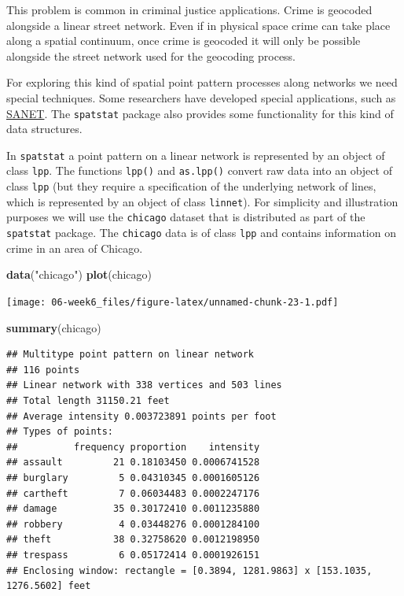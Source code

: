 \documentclass[]{book}
\newenvironment{Shaded}{\begin{snugshade}}{\end{snugshade}}
\newcommand{\KeywordTok}[1]{\textcolor[rgb]{0.13,0.29,0.53}{\textbf{#1}}}
\newcommand{\NormalTok}[1]{#1}
\newcommand{\StringTok}[1]{\textcolor[rgb]{0.31,0.60,0.02}{#1}}
\begin{document}
This problem is common in criminal justice applications. Crime is geocoded alongside a linear street network. Even if in physical space crime can take place along a spatial continuum, once crime is geocoded it will only be possible alongside the street network used for the geocoding process.

For exploring this kind of spatial point pattern processes along networks we need special techniques. Some researchers have developed special applications, such as \href{http://sanet.csis.u-tokyo.ac.jp/sub_en/manual.html}{SANET}. The \texttt{spatstat} package also provides some functionality for this kind of data structures.

In \texttt{spatstat} a point pattern on a linear network is represented by an object of class \texttt{lpp}. The functions \texttt{lpp()} and \texttt{as.lpp()} convert raw data into an object of class \texttt{lpp} (but they require a specification of the underlying network of lines, which is represented by an object of class \texttt{linnet}). For simplicity and illustration purposes we will use the \texttt{chicago} dataset that is distributed as part of the \texttt{spatstat} package. The \texttt{chicago} data is of class \texttt{lpp} and contains information on crime in an area of Chicago.

\begin{Shaded}
\begin{Highlighting}[]
\KeywordTok{data}\NormalTok{(}\StringTok{"chicago"}\NormalTok{)}
\KeywordTok{plot}\NormalTok{(chicago)}
\end{Highlighting}
\end{Shaded}

\texttt{[image: 06-week6\_files/figure-latex/unnamed-chunk-23-1.pdf]}

\begin{Shaded}
\begin{Highlighting}[]
\KeywordTok{summary}\NormalTok{(chicago)}
\end{Highlighting}
\end{Shaded}

\begin{verbatim}
## Multitype point pattern on linear network
## 116 points
## Linear network with 338 vertices and 503 lines
## Total length 31150.21 feet
## Average intensity 0.003723891 points per foot
## Types of points:
##          frequency proportion    intensity
## assault         21 0.18103450 0.0006741528
## burglary         5 0.04310345 0.0001605126
## cartheft         7 0.06034483 0.0002247176
## damage          35 0.30172410 0.0011235880
## robbery          4 0.03448276 0.0001284100
## theft           38 0.32758620 0.0012198950
## trespass         6 0.05172414 0.0001926151
## Enclosing window: rectangle = [0.3894, 1281.9863] x [153.1035, 1276.5602] feet
\end{verbatim}
\end{document}
